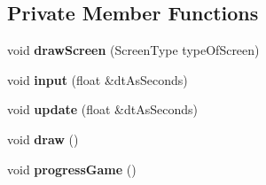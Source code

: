 \subsection*{Private Member Functions}
\begin{DoxyCompactItemize}
\item 
\mbox{\label{class_engine_a19be6708b8b65c5cfd8c13305f1e3c7f}} 
void {\bfseries draw\+Screen} (Screen\+Type type\+Of\+Screen)
\item 
\mbox{\label{class_engine_aa59920acbc4379a9672265904bc08b98}} 
void {\bfseries input} (float \&dt\+As\+Seconds)
\item 
\mbox{\label{class_engine_af40c099ae4c70e308303ef5220ee9052}} 
void {\bfseries update} (float \&dt\+As\+Seconds)
\item 
\mbox{\label{class_engine_a1b654dc41dfbcb5072147f33142b726e}} 
void {\bfseries draw} ()
\item 
\mbox{\label{class_engine_a54ab8f7be8ce000f7bd83a98d41d6b98}} 
void {\bfseries progress\+Game} ()
\end{DoxyCompactItemize}
